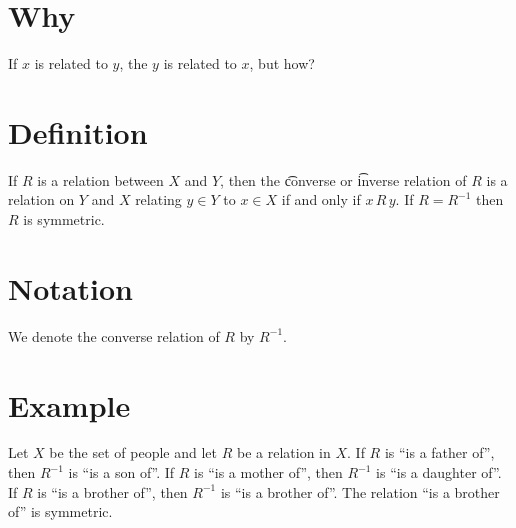
\section*{Why}

If $x$ is related to $y$, the $y$ is related to $x$, but how?

\section*{Definition}

If $R$ is a relation between $X$ and $Y$, then the \t{converse} or \t{inverse} relation of $R$ is a relation on $Y$ and $X$ relating $y \in Y$ to $x \in X$ if and only if $x\,R\,y$.
If $R = R^{-1}$ then $R$ is symmetric.

\section*{Notation}

We denote the converse relation of $R$ by $R^{-1}$.

\section*{Example}

Let $X$ be the set of people and let $R$ be a relation in $X$.
If $R$ is ``is a father of'', then $R^{-1}$ is ``is a son of''.
If $R$ is ``is a mother of'', then $R^{-1}$ is ``is a daughter of''.
If $R$ is ``is a brother of'', then $R^{-1}$ is ``is a brother of''.
The relation ``is a brother of'' is symmetric.

\blankpage
